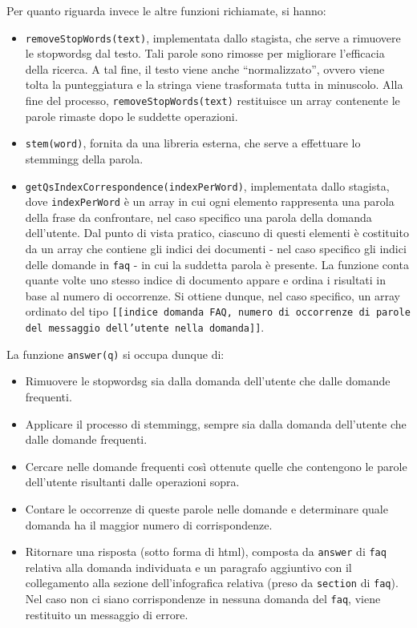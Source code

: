 \noindent Per quanto riguarda invece le altre funzioni richiamate, si hanno:
\begin{itemize}
    \item \texttt{removeStopWords(text)}, implementata dallo stagista, che serve a rimuovere le \gls{stopwordsg} dal testo. 
    Tali parole sono rimosse per migliorare l'efficacia della ricerca. A tal fine, il testo viene anche ``normalizzato'', ovvero viene
    tolta la punteggiatura e la stringa viene trasformata tutta in minuscolo.
    Alla fine del processo, \texttt{removeStopWords(text)} restituisce un array contenente le parole rimaste dopo le suddette operazioni.
    \item \texttt{stem(word)}, fornita da una libreria esterna, che serve a effettuare lo \gls{stemmingg} della parola.
    \item \texttt{getQsIndexCorrespondence(indexPerWord)}, implementata dallo stagista, dove \texttt{indexPerWord} è un array in cui ogni elemento rappresenta 
    una parola della frase da confrontare, nel caso specifico una parola della domanda dell'utente. Dal punto di vista pratico, ciascuno di questi elementi è costituito da un array 
    che contiene gli indici dei documenti - nel caso specifico gli indici delle domande in \texttt{faq} - in cui la suddetta parola è presente.
    La funzione conta quante volte uno stesso indice di documento appare e ordina i risultati in base al numero di occorrenze. Si ottiene dunque, nel caso specifico, 
    un array ordinato del tipo \texttt{[[indice domanda FAQ, numero di occorrenze di parole del messaggio dell'utente nella domanda]]}. 
\end{itemize}
La funzione \texttt{answer(q)} si occupa dunque di:
\begin{itemize}
    \item Rimuovere le \gls{stopwordsg} sia dalla domanda dell'utente che dalle domande frequenti.
    \item Applicare il processo di \gls{stemmingg}, sempre sia dalla domanda dell'utente che dalle domande frequenti.
    \item Cercare nelle domande frequenti così ottenute quelle che contengono le parole dell'utente risultanti dalle operazioni sopra.
    \item Contare le occorrenze di queste parole nelle domande e determinare quale domanda ha il maggior numero di corrispondenze.
    \item Ritornare una risposta (sotto forma di \gls{html}), composta da \texttt{answer} di \texttt{faq} relativa 
    alla domanda individuata e un paragrafo aggiuntivo con il collegamento alla sezione dell'infografica relativa (preso da \texttt{section} di \texttt{faq}).
    Nel caso non ci siano corrispondenze in nessuna domanda del \texttt{faq}, viene restituito un messaggio di errore.
\end{itemize}

